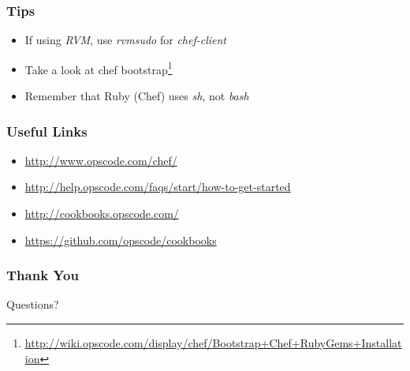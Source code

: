 \documentclass[16pt]{beamer}
\begin{document}
\begin{frame}
  \frametitle{Tips}
  \begin{itemize}
    \item If using \emph{RVM}, use \emph{rvmsudo} for \emph{chef-client}
    \item Take a look at chef bootstrap\footnote{\url{http://wiki.opscode.com/display/chef/Bootstrap+Chef+RubyGems+Installation}}
    \item Remember that Ruby (Chef) uses \emph{sh}, not \emph{bash}
  \end{itemize}
\end{frame}

\begin{frame}
  \frametitle{Useful Links}
  \begin{footnotesize}
    \begin{itemize}
      \item \url{http://www.opscode.com/chef/}
      \item \url{http://help.opscode.com/faqs/start/how-to-get-started}
      \item \url{http://cookbooks.opscode.com/}
      \item \url{https://github.com/opscode/cookbooks}
    \end{itemize}
  \end{footnotesize}
\end{frame}

\begin{frame}
  \frametitle{Thank You}
  \begin{center}
    \Huge Questions?
  \end{center}
\end{frame}
\end{document}
